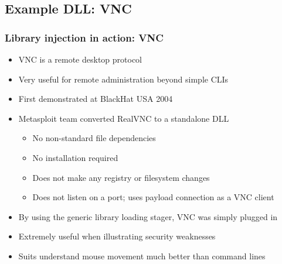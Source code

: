 \documentclass{beamer}
\newenvironment{sitemize}{\vspace{1mm}\begin{itemize}\itemsep 4pt\small}{\end{itemize}}
\begin{document}
%
%

\subsection{Example DLL: VNC}

\begin{frame}[t]
    \frametitle{Library injection in action: VNC}

    \begin{sitemize}
        \item VNC is a remote desktop protocol
        \item Very useful for remote administration beyond simple CLIs
    \end{sitemize}

    \pause
    \begin{sitemize}
        \item First demonstrated at BlackHat USA 2004

        \pause
        \item Metasploit team converted RealVNC to a standalone DLL
        \begin{sitemize}
            \item No non-standard file dependencies
            \item No installation required
            \item Does not make any registry or filesystem changes
            \item Does not listen on a port; uses payload connection as a VNC client
        \end{sitemize}

        \pause
        \item By using the generic library loading stager, VNC was simply plugged in
    \end{sitemize}

    \pause
    \begin{sitemize}
        \item Extremely useful when illustrating security weaknesses
        \item Suits understand mouse movement much better than command lines
    \end{sitemize}
\end{frame}
\end{document}
